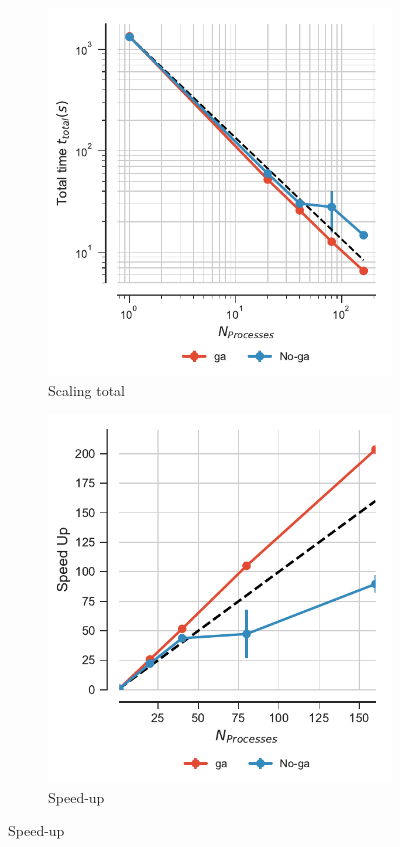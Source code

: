 \begin{figure}[ht!]
\begin{subfigure}{.3\textwidth}
  \includegraphics[width=\linewidth]{figures/Comparison_tot_time_traj_splitting-SuperMIC.pdf}
  \caption{Scaling total}
  \label{fig:MPItottime-chain-reader}
\end{subfigure}
\hfill
\begin{subfigure}{.3\textwidth}
  \includegraphics[width=\linewidth]{figures/Comparison_Speed_UP_traj_splitting-SuperMIC.pdf}
  \caption{Speed-up}
  \label{fig:MPIspeedup-chain-reader}
\end{subfigure}


\end{figure}
